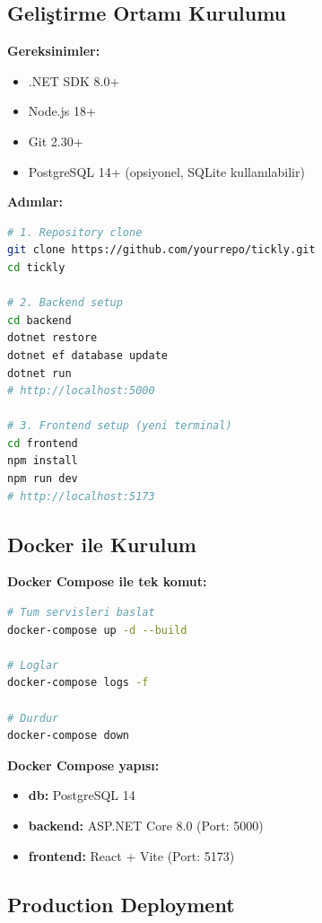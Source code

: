 \documentclass[12pt,a4paper]{article}
\begin{document}
\subsection{Geliştirme Ortamı Kurulumu}

\textbf{Gereksinimler:}
\begin{itemize}
    \item .NET SDK 8.0+
    \item Node.js 18+
    \item Git 2.30+
    \item PostgreSQL 14+ (opsiyonel, SQLite kullanılabilir)
\end{itemize}

\textbf{Adımlar:}

\begin{lstlisting}[language=bash]
# 1. Repository clone
git clone https://github.com/yourrepo/tickly.git
cd tickly

# 2. Backend setup
cd backend
dotnet restore
dotnet ef database update
dotnet run
# http://localhost:5000

# 3. Frontend setup (yeni terminal)
cd frontend
npm install
npm run dev
# http://localhost:5173
\end{lstlisting}

\subsection{Docker ile Kurulum}

\textbf{Docker Compose ile tek komut:}

\begin{lstlisting}[language=bash]
# Tum servisleri baslat
docker-compose up -d --build

# Loglar
docker-compose logs -f

# Durdur
docker-compose down
\end{lstlisting}

\textbf{Docker Compose yapısı:}
\begin{itemize}
    \item \textbf{db:} PostgreSQL 14
    \item \textbf{backend:} ASP.NET Core 8.0 (Port: 5000)
    \item \textbf{frontend:} React + Vite (Port: 5173)
\end{itemize}

\subsection{Production Deployment}
\end{document}
